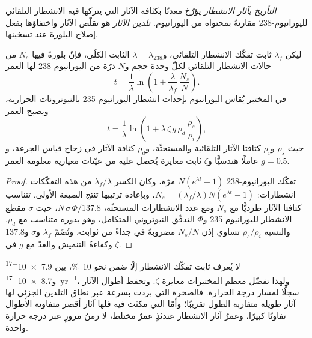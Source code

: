 \begin{definition}\label{def:b3:advanced-geochronology:fission-track}
\emph{التأريخ بآثار الانشطار} يؤرّخ معدنًا
بكثافة الآثار التي يتركها فيه الانشطار التلقائي لليورانيوم-238
مقارنةً بمحتواه من اليورانيوم. \emph{تلدين
الآثار} هو تقلّص الآثار واختفاؤها بفعل إصلاح
البلورة عند تسخينها.
\end{definition}

\begin{theorem}\label{thm:b3:advanced-geochronology:fission-track}
ليكن $\lambda_f$ ثابت تفكّك الانشطار التلقائي، و$\lambda =
\lambda_{238}$ الثابت الكلّي، فإنّ بلورةً فيها $N_s$ من حالات الانشطار التلقائي لكلّ وحدة
حجم و$N$ ذرّة من اليورانيوم-238 لها العمر
\[
t = \frac1\lambda\ln\left(1 + \frac{\lambda}{\lambda_f}\,\frac{N_s}{N}\right).
\]
في المختبر يُقاس اليورانيوم بإحداث انشطار
اليورانيوم-235 بالنيوترونات الحرارية، ويصبح العمر
\[
t = \frac1\lambda\ln\left(1 + \lambda\,\zeta\,g\,\rho_d\,\frac{\rho_s}{\rho_i}\right),
\]
حيث $\rho_s$ و$\rho_i$ كثافتا الآثار التلقائية والمستحثّة،
و$\rho_d$ كثافة الآثار في زجاج قياس الجرعة، و$g = 0.5$ عاملًا هندسيًّا
و$\zeta$ ثابت معايرة يُحصل عليه من عيّنات معيارية معلومة العمر.
\end{theorem}

\begin{proof}
تفكّك اليورانيوم-238 $N(e^{\lambda t} - 1)$ مرّة، وكان الكسر
$\lambda_f/\lambda$ من هذه التفكّكات انشطارات: $N_s =
(\lambda_f/\lambda)N(e^{\lambda t} - 1)$، وبإعادة ترتيبها تنتج الصيغة الأولى.
تتناسب كثافتا الآثار طرديًّا مع $N_s$ ومع عدد
الانشطارات المستحثّة، $N\,\sigma\,\Phi/137.8$، حيث $\sigma$ مقطع الانشطار
لليورانيوم-235 و$\Phi$ التدفّق النيوتروني المتكامل، وهو بدوره
متناسب مع $\rho_d$. والنسبة $\rho_s/\rho_i$ تساوي إذن $N_s/N$ مضروبةً في
جداءً من ثوابت، وتُضَمّ $\lambda_f$ و$\sigma$ و$137.8$ وكفاءةُ
التنميش والعدّ مع $g$ في $\zeta$.
\end{proof}

لا يُعرف ثابت تفكّك الانشطار إلّا ضمن نحو \qty{10}{\percent}،
بين \num{7.9e-17} و\qty{8.7e-17}{yr^{-1}}، ولهذا تفضّل معظم
المختبرات معايرة $\zeta$. وتحفظ أطوال الآثار
سجلًّا لمسار درجة الحرارة. فالصخرة التي بردت بسرعة عبر
نطاق التلدين الجزئي لها آثار طويلة متقاربة الطول تقريبًا؛ وأمّا التي
مكثت فيه فلها آثار أقصر متفاوتة الأطوال تفاوتًا كبيرًا، وعمرُ
آثار الانشطار عندئذٍ عمرٌ مختلط، لا زمنُ مرورٍ عبر درجة
حرارة واحدة.

